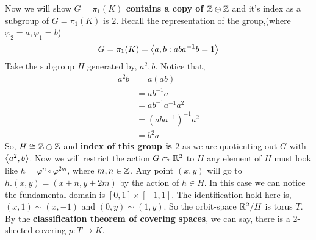 \documentclass[11pt]{article}
\begin{document}
\noindent Now we will show \textbf{$G = \pi_1(K)$ contains a copy of $\mathbb{Z} \oplus \mathbb{Z}$} and it's index as a subgroup of $G = \pi_1(K)$ is $2$. Recall the representation of the group,(where $\varphi_2 =a,\varphi_1=b$) $$G=\pi_1(K) = \left\langle {a}, {b : aba^{-1}b = 1} \right\rangle$$
Take the subgroup $H$ generated by, $a^2,b$. Notice that, \begin{align*}
    a^2b & = a(ab) \\
    &= ab^{-1}a \\
    &= ab^{-1}a^{-1}a^2 \\
    &= (aba^{-1})^{-1}a^2\\
    &= b^2a
\end{align*}
So, $H \cong \mathbb{Z} \oplus \mathbb{Z}$ and \textbf{index of this group is $2$} as we are quotienting out $G$ with $\left\langle {a^2}, {b} \right\rangle$. Now we will restrict the action $G \curvearrowright \mathbb{R}^2$ to $H$ any element of $H$ must look like $h=\varphi^{n} \circ \varphi^{2m}$, where $m,n \in \mathbb{Z}$. Any point $(x,y)$ will go to $h.(x,y) = (x+n,y+2m)$ by the action of $h \in H$. In this case we can notice the fundamental domain is $[0,1]\times [-1,1]$. The identification hold here is, $(x,1)\sim (x,-1)$ and $(0,y)\sim (1,y)$. So the orbit-space $\mathbb{R}^2 / H$ is torus $T$. By the \textbf{\textsf{classification theorem of covering spaces}}, we can say, there is a $2$-sheeted covering $p:T \to K$. 
\end{document}
